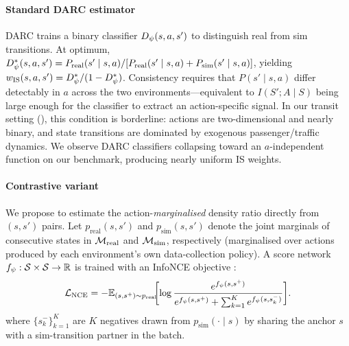 \paragraph{Standard DARC estimator}
DARC \citep{eysenbach2021off} trains a binary classifier $D_\psi(s, a, s')$ to distinguish real from sim transitions.
At optimum,
$D_\psi^*(s, a, s') = P_{\mathrm{real}}(s' \mid s, a)/[P_{\mathrm{real}}(s' \mid s, a) + P_{\mathrm{sim}}(s' \mid s, a)]$,
yielding $w_{\mathrm{IS}}(s,a,s') = D_\psi^*/(1-D_\psi^*)$.
Consistency requires that $P(s' \mid s, a)$ differ detectably in $a$ across the two environments---equivalent to $I(S'; A \mid S)$ being large enough for the classifier to extract an action-specific signal.
In our transit setting (), this condition is borderline: actions are two-dimensional and nearly binary, and state transitions are dominated by exogenous passenger/traffic dynamics.
We observe DARC classifiers collapsing toward an $a$-independent function on our benchmark, producing nearly uniform IS weights.

\paragraph{Contrastive variant}
We propose to estimate the action-\emph{marginalised} density ratio directly from $(s, s')$ pairs.
Let $p_{\text{real}}(s, s')$ and $p_{\text{sim}}(s, s')$ denote the joint marginals of consecutive states in $\mathcal{M}_{\mathrm{real}}$ and $\mathcal{M}_{\mathrm{sim}}$, respectively (marginalised over actions produced by each environment's own data-collection policy).
A score network $f_\psi : \mathcal{S} \times \mathcal{S} \to \mathbb{R}$ is trained with an InfoNCE objective \citep{oord2018representation}:
\begin{equation}
\begin{aligned}
\mathcal{L}_{\text{NCE}} = -\mathbb{E}_{(s, s^+) \sim p_{\text{real}}}\!\!\biggl[ \log \frac{e^{f_\psi(s, s^+)}}{e^{f_\psi(s, s^+)} + \sum_{k=1}^{K} e^{f_\psi(s, s^-_k)}} \biggr].
\end{aligned}
\label{eq:nce}
\end{equation}
where $\{s^-_k\}_{k=1}^{K}$ are $K$ negatives drawn from $p_{\text{sim}}(\cdot \mid s)$ by sharing the anchor $s$ with a sim-transition partner in the batch.

